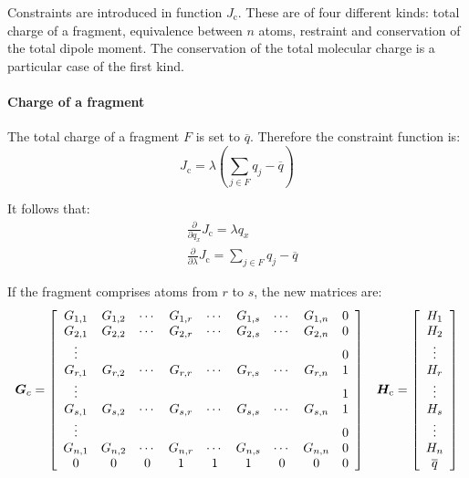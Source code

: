 \documentclass[a4paper]{report}
\newcommand{\bs}{\boldsymbol}
\newcommand{\mr}{\mathrm}
\begin{document}
Constraints are introduced in function $J_\mr{c}$. These are of four different kinds:
total charge of a fragment, equivalence between $n$ atoms, restraint and conservation of the total dipole moment. The conservation of the total molecular charge is a particular
case of the first kind.

\paragraph{Charge of a fragment}

The total charge of a fragment $F$ is set to $\overline{q}$. Therefore the constraint
function is:
\begin{equation}
J_\mr{c} = \lambda\left(\sum_{j\in F} q_j - \overline{q} \right) 
\end{equation}

It follows that:
\begin{align}
&\frac{\partial}{\partial q_x} J_\mr{c} = \lambda q_x \\
&\frac{\partial}{\partial \lambda} J_\mr{c} = \sum_{j\in F} q_j - \overline{q}
\end{align}

If the fragment comprises atoms from $r$ to $s$, the new matrices are:
\begin{equation}
\bs{G}_c = \left[ \begin{array}{ccccccccc} 
G_{1,1} & G_{1,2} & \cdots & G_{1,r} & \cdots & G_{1,s} & \cdots & G_{1,n} & 0 \\
G_{2,1} & G_{2,2} & \cdots & G_{2,r} & \cdots & G_{2,s} & \cdots & G_{2,n} & 0 \\
\vdots  &         &        &         &        &         &        &         & 0 \\
G_{r,1} & G_{r,2} & \cdots & G_{r,r} & \cdots & G_{r,s} & \cdots & G_{r,n} & 1 \\
\vdots  &         &        &         &        &         &        &         & 1 \\
G_{s,1} & G_{s,2} & \cdots & G_{s,r} & \cdots & G_{s,s} & \cdots & G_{s,n} & 1 \\
\vdots  &         &        &         &        &         &        &         & 0 \\
G_{n,1} & G_{n,2} & \cdots & G_{n,r} & \cdots & G_{n,s} & \cdots & G_{n,n} & 0 \\
0       & 0       & 0      & 1       & 1      & 1       & 0      & 0       & 0 \\
\end{array} \right] \hspace{0.3cm} \bs{H}_\mr{c} = \left[ \begin{array}{c} H_1 \\ H_2 \\ \vdots \\ H_r \\ \vdots \\ H_s \\ \vdots \\ H_n \\ \overline{q} \end{array} \right]
\end{equation}
\end{document}
